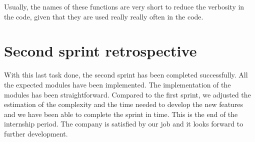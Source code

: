 Usually, the names of these functions are very short to reduce the verbosity in the code, given that they are used really really often in the code.

\section{Second sprint retrospective}

With this last task done, the second sprint has been completed successfully. All the expected modules have been implemented. The implementation of the modules has been straightforward. Compared to the first sprint, we adjusted the estimation of the complexity and the time needed to develop the new features and we have been able to complete the sprint in time. This is the end of the internship period. The company is satisfied by our job and it looks forward to further development.

